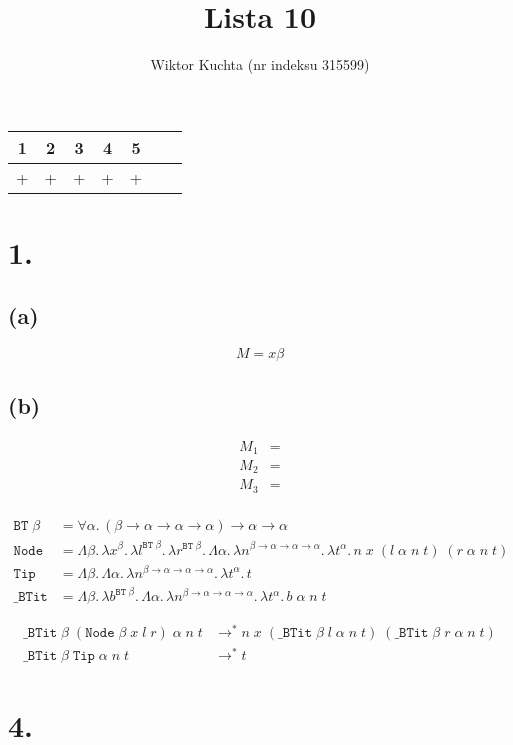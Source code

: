 \documentclass[a4paper, 12pt]{article}
\title{Lista 10}
\author{Wiktor Kuchta (nr indeksu 315599)}
\newcommand{\+}{\enspace}
\begin{document}
\maketitle

\begin{center}
	\begin{tabular}{ |*{7}{c|} }
	\hline
	1 & 2 & 3 & 4 & 5 \\
	\hline
	+ & + & + & + & + \\
	\hline
\end{tabular}
\end{center}

\section*{1.}

\subsection*{(a)}
$$M = x β$$

\subsection*{(b)}

\begin{align*}
	M_1 &= \\
	M_2 &= \\
	M_3 &= \\
\end{align*}

\begin{align*}
	\texttt{BT}\;β &= ∀α.\,(β → α → α → α) → α → α \\
	\texttt{Node} &= Λβ.\,λx^β.\,λl^{\texttt{BT}\;β}.\,λr^{\texttt{BT}\;β}.\,
	Λα.\,λn^{β→α→α→α}.\,λt^α.\,n\;x\;(l\;α\;n\;t)\;(r\;α\;n\;t) \\
	\texttt{Tip} &= Λβ.\,Λα.\,λn^{β→α→α→α}.\,λt^α.\,t \\
	\texttt{\_BTit} &= Λβ.\,λb^{\texttt{BT}\;β}.\,Λα.\,λn^{β→α→α→α}.\,λt^α.\,b\;α\;n\;t
\end{align*}

\begin{align*}
	\texttt{\_BTit}\;β\;(\texttt{Node}\;β\;x\;l\;r)\;α\;n\;t &\rightarrow^*
	n\;x\;(\texttt{\_BTit}\;β\;l\;α\;n\;t)\;(\texttt{\_BTit}\;β\;r\;α\;n\;t) \\
	\texttt{\_BTit}\;β\;\texttt{Tip}\;α\;n\;t &\rightarrow^*
	t
\end{align*}

\section*{4.}
\end{document}
